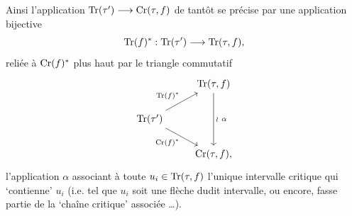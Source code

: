 Ainsi l'application $\mathrm{Tr}(\tau') \longrightarrow \mathrm{Cr}(\tau, f)$ de tantôt se précise par une application bijective
\[
\mathrm{Tr}(f)^* : \mathrm{Tr}(\tau') \longrightarrow \mathrm{Tr}(\tau, f),
\]
reliée à $\mathrm{Cr}(f)^*$ plus haut par le triangle commutatif
\[
\begin{tikzcd}
 & \Tr(\tau, f) \arrow[dd, "\wr\ \alpha"] \\
\Tr(\tau') \arrow[ur, "\Tr(f)^*"] \arrow[dr, "\Cr(f)^*"'] & \\
 & \Cr(\tau, f),
\end{tikzcd}
\]
l'application $\alpha$ associant à toute $u_i \in \mathrm{Tr}(\tau, f)$ l'unique intervalle critique qui ‘contienne’ $u_i$ (i.e. tel que $u_i$ soit une flèche dudit intervalle, ou encore, fasse partie de la ‘chaîne critique’ associée \dots).

